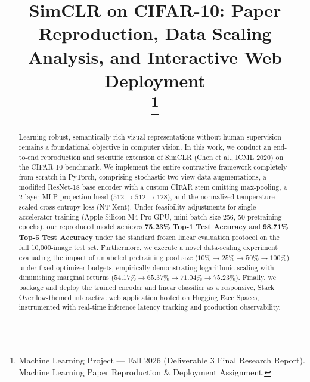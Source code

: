 \documentclass[conference]{IEEEtran}
\begin{document}
\title{SimCLR on CIFAR-10: Paper Reproduction, Data Scaling Analysis, and Interactive Web Deployment\\
\thanks{Machine Learning Project --- Fall 2026 (Deliverable 3 Final Research Report). Machine Learning Paper Reproduction \& Deployment Assignment.}
}

\author{
\and
{}
\and
{}
}

\maketitle

\begin{abstract}
Learning robust, semantically rich visual representations without human supervision remains a foundational objective in computer vision. In this work, we conduct an end-to-end reproduction and scientific extension of SimCLR (Chen et al., ICML 2020) on the CIFAR-10 benchmark. We implement the entire contrastive framework completely from scratch in PyTorch, comprising stochastic two-view data augmentations, a modified ResNet-18 base encoder with a custom CIFAR stem omitting max-pooling, a 2-layer MLP projection head ($512 \to 512 \to 128$), and the normalized temperature-scaled cross-entropy loss (NT-Xent). Under feasibility adjustments for single-accelerator training (Apple Silicon M4 Pro GPU, mini-batch size 256, 50 pretraining epochs), our reproduced model achieves \textbf{75.23\% Top-1 Test Accuracy} and \textbf{98.71\% Top-5 Test Accuracy} under the standard frozen linear evaluation protocol on the full 10,000-image test set. Furthermore, we execute a novel data-scaling experiment evaluating the impact of unlabeled pretraining pool size ($10\% \to 25\% \to 50\% \to 100\%$) under fixed optimizer budgets, empirically demonstrating logarithmic scaling with diminishing marginal returns ($54.17\% \to 65.37\% \to 71.04\% \to 75.23\%$). Finally, we package and deploy the trained encoder and linear classifier as a responsive, Stack Overflow-themed interactive web application hosted on Hugging Face Spaces, instrumented with real-time inference latency tracking and production observability.
\end{abstract}
\end{document}
